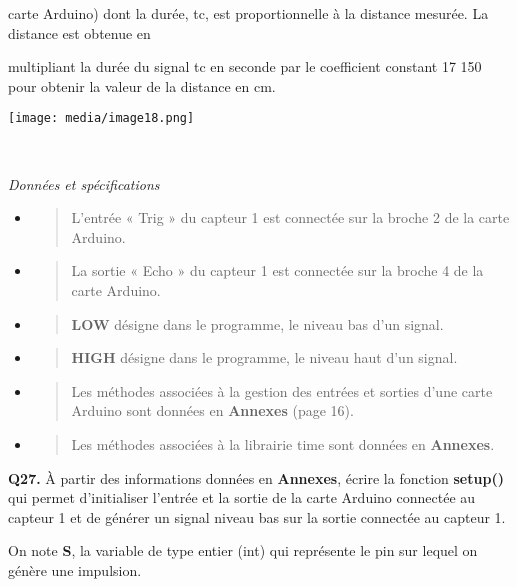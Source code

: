 \documentclass[]{article}
\begin{document}
carte Arduino) dont la durée, tc, est proportionnelle à la distance
mesurée. La distance est obtenue en

multipliant la durée du signal tc en seconde par le coefficient constant
17 150 pour obtenir la valeur de la distance en cm.

\texttt{[image: media/image18.png]}

\emph{\\
}

\emph{Données et spécifications}

\begin{itemize}
\item
  \begin{quote}
  L'entrée « Trig » du capteur 1 est connectée sur la broche 2 de la
  carte Arduino.
  \end{quote}
\item
  \begin{quote}
  La sortie « Echo » du capteur 1 est connectée sur la broche 4 de la
  carte Arduino.
  \end{quote}
\item
  \begin{quote}
  \textbf{LOW} désigne dans le programme, le niveau bas d'un signal.
  \end{quote}
\item
  \begin{quote}
  \textbf{HIGH} désigne dans le programme, le niveau haut d'un signal.
  \end{quote}
\item
  \begin{quote}
  Les méthodes associées à la gestion des entrées et sorties d'une carte
  Arduino sont données en \textbf{Annexes} (page 16).
  \end{quote}
\item
  \begin{quote}
  Les méthodes associées à la librairie time sont données en
  \textbf{Annexes}.
  \end{quote}
\end{itemize}

\textbf{Q27.} À partir des informations données en \textbf{Annexes},
écrire la fonction \textbf{setup()} qui permet d'initialiser l'entrée et
la sortie de la carte Arduino connectée au capteur 1 et de générer un
signal niveau bas sur la sortie connectée au capteur 1.

On note \textbf{S}, la variable de type entier (int) qui représente le
pin sur lequel on génère une impulsion.
\end{document}
